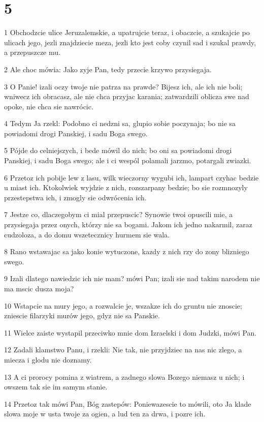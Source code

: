 \chapter{5}

\par 1 Obchodzcie ulice Jeruzalemskie, a upatrujcie teraz, i obaczcie, a szukajcie po ulicach jego, jezli znajdziecie meza, jezli kto jest coby czynil sad i szukal prawdy, a przepuszcze mu.
\par 2 Ale choc mówia: Jako zyje Pan, tedy przecie krzywo przysiegaja.
\par 3 O Panie! izali oczy twoje nie patrza na prawde? Bijesz ich, ale ich nie boli; wniwecz ich obracasz, ale nie chca przyjac karania; zatwardzili oblicza swe nad opoke, nie chca sie nawrócic.
\par 4 Tedym Ja rzekl: Podobno ci nedzni sa, glupio sobie poczynaja; bo nie sa powiadomi drogi Panskiej, i sadu Boga swego.
\par 5 Pójde do celniejszych, i bede mówil do nich; bo oni sa powiadomi drogi Panskiej, i sadu Boga swego; ale i ci wespól polamali jarzmo, potargali zwiazki.
\par 6 Przetoz ich pobije lew z lasu, wilk wieczorny wygubi ich, lampart czyhac bedzie u miast ich. Ktokolwiek wyjdzie z nich, rozszarpany bedzie; bo sie rozmnozyly przestepstwa ich, i zmogly sie odwrócenia ich.
\par 7 Jestze co, dlaczegobym ci mial przepuscic? Synowie twoi opuscili mie, a przysiegaja przez onych, którzy nie sa bogami. Jakom ich jedno nakarmil, zaraz cudzoloza, a do domu wszetecznicy hurmem sie wala.
\par 8 Rano wstawajac sa jako konie wytuczone, kazdy z nich rzy do zony blizniego swego.
\par 9 Izali dlatego nawiedzic ich nie mam? mówi Pan; izali sie nad takim narodem nie ma mscic dusza moja?
\par 10 Wstapcie na mury jego, a rozwalcie je, wszakze ich do gruntu nie znoscie; zniescie filarzyki murów jego, gdyz nie sa Panskie.
\par 11 Wielce zaiste wystapil przeciwko mnie dom Izraelski i dom Judzki, mówi Pan.
\par 12 Zadali klamstwo Panu, i rzekli: Nie tak, nie przyjdziec na nas nic zlego, a miecza i glodu nie doznamy.
\par 13 A ci prorocy pomina z wiatrem, a zadnego slowa Bozego niemasz u nich; i owszem tak sie im samym stanie.
\par 14 Przetoz tak mówi Pan, Bóg zastepów: Poniewazescie to mówili, oto Ja klade slowa moje w usta twoje za ogien, a lud ten za drwa, i pozre ich.
